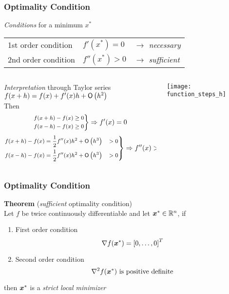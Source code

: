 \documentclass[%
  final,
  11pt, 
  show notes, %
  t, %
  fleqn, %
]{beamer}
\begin{document}
\begin{frame}
  \frametitle{Optimality Condition}
\emph{Conditions} for a minimum $x^\ast$

\vspace*{0.2cm}
\begin{center}
\begin{tabular}{lll}
1st order condition & $f'(x^\ast) = 0$ & \textit{$\rightarrow$ necessary} \\
2nd order condition & $f''(x^\ast) > 0$ & \textit{$\rightarrow$ sufficient}
\end{tabular}
\end{center}

\vspace*{0.4cm}
\begin{columns}[T]
\begin{column}{.65\textwidth}
\emph{Interpretation} through Taylor series\\
\qquad $f(x + h) = f(x) + f'(x) h + \mathsf{O}\left(h^2\right)$\\
Then
\begin{equation*}
\footnotesize
\left.
\begin{split}
f(x+h) - f(x) & \geq 0 \\
f(x-h) - f(x) & \geq 0
\end{split}
\right\}
\Rightarrow f'(x) = 0
\end{equation*}
\begin{equation*}
\footnotesize
\left.
\begin{split}
f(x+h) - f(x) & = \frac{1}{2} f''(x) h^2 + \mathsf{O}\left(h^3\right) & > 0 \\
f(x-h) - f(x) & = \frac{1}{2} f''(x) h^2 + \mathsf{O}\left(h^3\right) & > 0
\end{split}
\right\}
\Rightarrow f''(x) > 0
\end{equation*}
\end{column}
\begin{column}{.3\textwidth}
\texttt{[image: function\_steps\_h]}
\end{column}
\end{columns}
\end{frame}

\begin{frame}
  \frametitle{Optimality Condition}
\textbf{Theorem} (\emph{sufficient} optimality condition)\\
Let $f$ be twice continuously differentiable and let $\bm{x}^\ast \in \mathbb{R}^n$, if
\begin{enumerate}
\item First order condition
\begin{equation*}
\nabla f(\bm{x}^\ast) = \left[ 0, \ldots, 0 \right]^T
\end{equation*}
\item Second order condition
\begin{equation*}
\nabla^2 f(\bm{x}^\ast) \text{ is positive definite}
\end{equation*}
\end{enumerate}
then $\bm{x}^\ast$ is a \emph{strict local minimizer}
\vspace*{0.4cm}
\end{frame}
\end{document}
